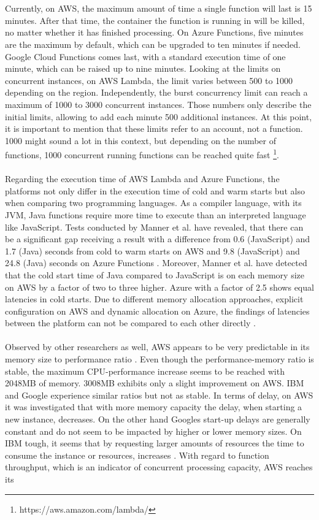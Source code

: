 \documentclass[a4paper,twoside,11pt, pagesize]{scrartcl}
\begin{document}
\begin{spacing}{1.2}
\\\\ Currently, on AWS, the maximum amount of time a single function will last is 15 minutes. After that time, the container the function is running in will be killed, no matter whether it has finished processing. On Azure Functions, five minutes are the maximum by default, which can be upgraded to ten minutes if needed. Google Cloud Functions comes last, with a standard execution time of one minute, which can be raised up to nine minutes. Looking at the limits on concurrent instances, on AWS Lambda, the limit varies between 500 to 1000 depending on the region. Independently, the burst concurrency limit can reach a maximum of 1000 to 3000 concurrent instances. Those numbers only describe the initial limits, allowing to add each minute 500 additional instances. At this point, it is important to mention that these limits refer to an account, not a function. 1000 might sound a lot in this context, but depending on the number of functions, 1000 concurrent running functions can be reached quite fast \footnote{https://aws.amazon.com/lambda/}.\\\\ Regarding the execution time of AWS Lambda and Azure Functions, the platforms not only differ in the execution time of cold and warm starts but also when comparing two programming languages. As a compiler language, with its JVM, Java functions require more time to execute than an interpreted language like JavaScript. Tests conducted by Manner et al. have revealed, that there can be a significant gap receiving a result with a difference from 0.6 (JavaScript) and 1.7 (Java) seconds from cold to warm starts on AWS and 9.8 (JavaScript) and 24.8 (Java) seconds on Azure Functions \cite{manner2018cold}. Moreover, Manner et al. have detected that the cold start time of Java compared to JavaScript is on each memory size on AWS by a factor of two to three higher. Azure with a factor of 2.5 shows equal latencies in cold starts. Due to different memory allocation approaches, explicit configuration on AWS and dynamic allocation on Azure, the findings of latencies between the platform can not be compared to each other directly \cite{manner2018cold}.\\\\ Observed by other researchers as well, AWS appears to be very predictable in its memory size to performance ratio \cite{pawlik2019performance}. Even though the performance-memory ratio is stable, the maximum CPU-performance increase seems to be reached with 2048MB of memory. 3008MB exhibits only a slight improvement on AWS. IBM and Google experience similar ratios but not as stable. In terms of delay, on AWS it was investigated that with more memory capacity the delay, when starting a new instance, decreases. On the other hand Googles start-up delays are generally constant and do not seem to be impacted by higher or lower memory sizes. On IBM tough, it seems that by requesting larger amounts of resources the time to consume the instance or resources, increases \cite{pawlik2019performance}. With regard to function throughput, which is an indicator of concurrent processing capacity, AWS reaches its 
\end{spacing}
\end{document}
